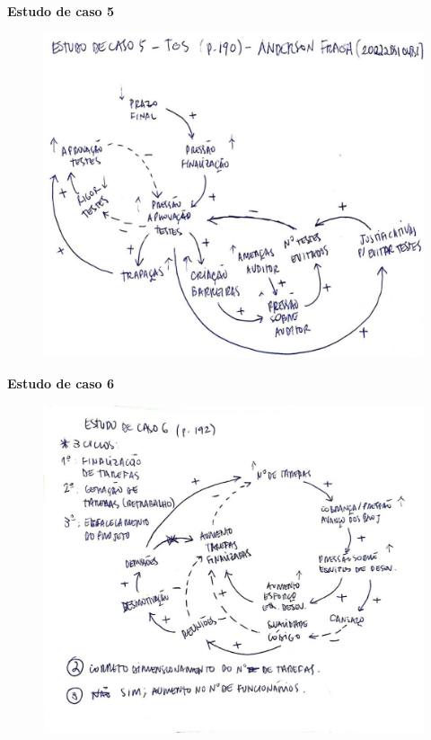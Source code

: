 \documentclass[11pt]{article}
\begin{document}
\begin{enumerate}
		\textbf{Estudo de caso 5}\par
		\begin{figure}[!h]
			\centering
			\includegraphics[width=0.80\linewidth]{atv2.jpg}
		\end{figure}
\pagebreak
        \textbf{Estudo de caso 6}\par
		\begin{figure}[!ht]
			\centering
			\includegraphics[width=0.90\linewidth]{atv1.jpg}
		\end{figure}

\end{enumerate}
\end{document}
